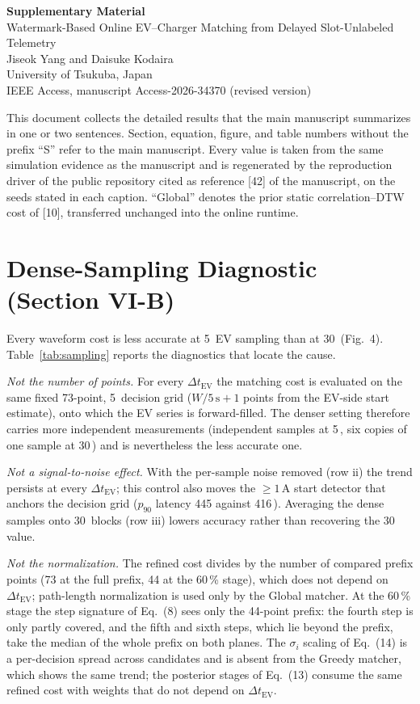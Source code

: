 \documentclass[10pt]{article}
\newcommand{\sq}{\,\text{s}}
\begin{document}
\begin{center}
{\Large\bfseries Supplementary Material}\\[4pt]
{\large Watermark-Based Online EV--Charger Matching from Delayed Slot-Unlabeled Telemetry}\\[6pt]
Jiseok Yang and Daisuke Kodaira\\
University of Tsukuba, Japan\\[2pt]
{\small IEEE Access, manuscript Access-2026-34370 (revised version)}
\end{center}

\noindent This document collects the detailed results that the main manuscript summarizes in one or two sentences. Section, equation, figure, and table numbers without the prefix ``S'' refer to the main manuscript. Every value is taken from the same simulation evidence as the manuscript and is regenerated by the reproduction driver of the public repository cited as reference [42] of the manuscript, on the seeds stated in each caption. ``Global'' denotes the prior static correlation--DTW cost of [10], transferred unchanged into the online runtime.

\section{Dense-Sampling Diagnostic (Section VI-B)}

Every waveform cost is less accurate at 5\sq{} EV sampling than at 30\sq{} (Fig.~4). Table~\ref{tab:sampling} reports the diagnostics that locate the cause.

\emph{Not the number of points.} For every $\Delta t_{\text{EV}}$ the matching cost is evaluated on the same fixed 73-point, 5\sq{} decision grid ($W/5\sq + 1$ points from the EV-side start estimate), onto which the EV series is forward-filled. The denser setting therefore carries more independent measurements (independent samples at 5\sq, six copies of one sample at 30\sq) and is nevertheless the less accurate one.

\emph{Not a signal-to-noise effect.} With the per-sample noise removed (row ii) the trend persists at every $\Delta t_{\text{EV}}$; this control also moves the $\geq 1$\,A start detector that anchors the decision grid ($p_{90}$ latency 445 against 416\sq). Averaging the dense samples onto 30\sq{} blocks (row iii) lowers accuracy rather than recovering the 30\sq{} value.

\emph{Not the normalization.} The refined cost divides by the number of compared prefix points (73 at the full prefix, 44 at the 60\,\% stage), which does not depend on $\Delta t_{\text{EV}}$; path-length normalization is used only by the Global matcher. At the 60\,\% stage the step signature of Eq.~(8) sees only the 44-point prefix: the fourth step is only partly covered, and the fifth and sixth steps, which lie beyond the prefix, take the median of the whole prefix on both planes. The $\sigma_i$ scaling of Eq.~(14) is a per-decision spread across candidates and is absent from the Greedy matcher, which shows the same trend; the posterior stages of Eq.~(13) consume the same refined cost with weights that do not depend on $\Delta t_{\text{EV}}$.
\end{document}
